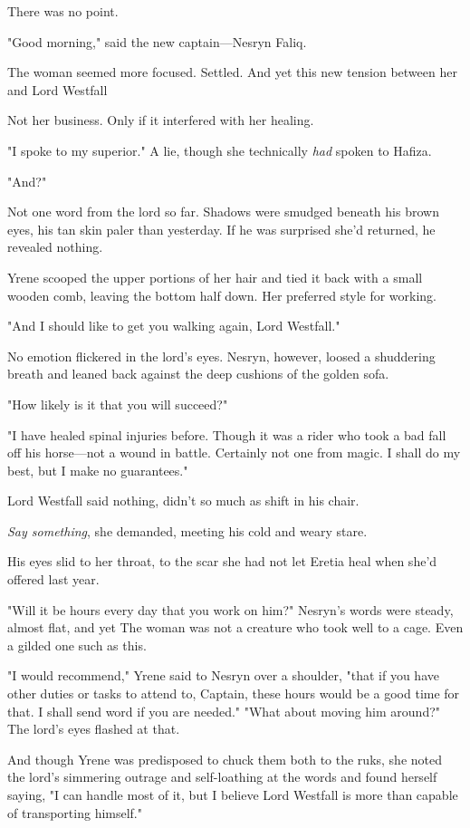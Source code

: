 There was no point.

"Good morning," said the new captain---Nesryn Faliq.

The woman seemed more focused. Settled. And yet this new tension between her and Lord Westfall 

Not her business. Only if it interfered with her healing.

"I spoke to my superior." A lie, though she technically \emph{had}
spoken to Hafiza.

"And?"

Not one word from the lord so far. Shadows were smudged beneath his brown eyes, his tan skin paler than yesterday. If he was surprised she'd returned, he revealed nothing.

Yrene scooped the upper portions of her hair and tied it back with a small wooden comb, leaving the bottom half down. Her preferred style for working.

"And I should like to get you walking again, Lord Westfall."

No emotion flickered in the lord's eyes. Nesryn, however, loosed a shuddering breath and leaned back against the deep cushions of the golden sofa.

"How likely is it that you will succeed?"

"I have healed spinal injuries before. Though it was a rider who took a bad fall off his horse---not a wound in battle. Certainly not one from magic. I shall do my best, but I make no guarantees."

Lord Westfall said nothing, didn't so much as shift in his chair.

\emph{Say something}, she demanded, meeting his cold and weary stare.

His eyes slid to her throat, to the scar she had not let Eretia heal when she'd offered last year.

"Will it be hours every day that you work on him?" Nesryn's words were steady, almost flat, and yet  The woman was not a creature who took well to a cage. Even a gilded one such as this.

"I would recommend," Yrene said to Nesryn over a shoulder, "that if you have other duties or tasks to attend to, Captain, these hours would be a good time for that. I shall send word if you are needed." "What about moving him around?" The lord's eyes flashed at that.

And though Yrene was predisposed to chuck them both to the ruks, she noted the lord's simmering outrage and self-loathing at the words and found herself saying, "I can handle most of it, but I believe Lord Westfall is more than capable of transporting himself."

